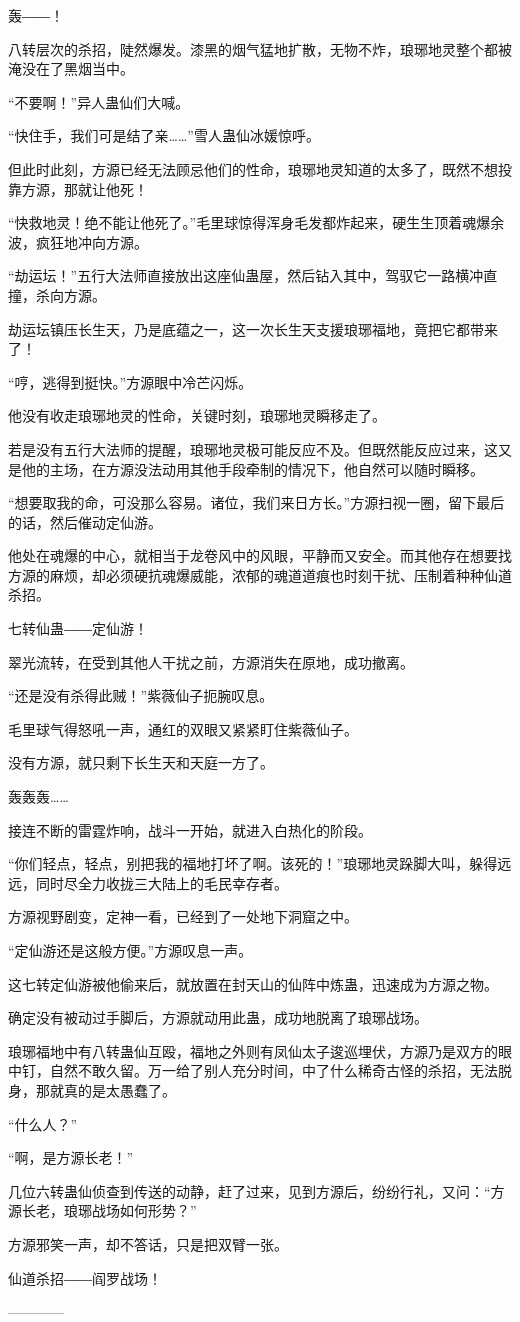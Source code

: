 \begin{this_body}
轰――！

八转层次的杀招，陡然爆发。漆黑的烟气猛地扩散，无物不炸，琅琊地灵整个都被淹没在了黑烟当中。

“不要啊！”异人蛊仙们大喊。

“快住手，我们可是结了亲……”雪人蛊仙冰媛惊呼。

但此时此刻，方源已经无法顾忌他们的性命，琅琊地灵知道的太多了，既然不想投靠方源，那就让他死！

“快救地灵！绝不能让他死了。”毛里球惊得浑身毛发都炸起来，硬生生顶着魂爆余波，疯狂地冲向方源。

“劫运坛！”五行大法师直接放出这座仙蛊屋，然后钻入其中，驾驭它一路横冲直撞，杀向方源。

劫运坛镇压长生天，乃是底蕴之一，这一次长生天支援琅琊福地，竟把它都带来了！

“哼，逃得到挺快。”方源眼中冷芒闪烁。

他没有收走琅琊地灵的性命，关键时刻，琅琊地灵瞬移走了。

若是没有五行大法师的提醒，琅琊地灵极可能反应不及。但既然能反应过来，这又是他的主场，在方源没法动用其他手段牵制的情况下，他自然可以随时瞬移。

“想要取我的命，可没那么容易。诸位，我们来日方长。”方源扫视一圈，留下最后的话，然后催动定仙游。

他处在魂爆的中心，就相当于龙卷风中的风眼，平静而又安全。而其他存在想要找方源的麻烦，却必须硬抗魂爆威能，浓郁的魂道道痕也时刻干扰、压制着种种仙道杀招。

七转仙蛊――定仙游！

翠光流转，在受到其他人干扰之前，方源消失在原地，成功撤离。

“还是没有杀得此贼！”紫薇仙子扼腕叹息。

毛里球气得怒吼一声，通红的双眼又紧紧盯住紫薇仙子。

没有方源，就只剩下长生天和天庭一方了。

轰轰轰……

接连不断的雷霆炸响，战斗一开始，就进入白热化的阶段。

“你们轻点，轻点，别把我的福地打坏了啊。该死的！”琅琊地灵跺脚大叫，躲得远远，同时尽全力收拢三大陆上的毛民幸存者。

方源视野剧变，定神一看，已经到了一处地下洞窟之中。

“定仙游还是这般方便。”方源叹息一声。

这七转定仙游被他偷来后，就放置在封天山的仙阵中炼蛊，迅速成为方源之物。

确定没有被动过手脚后，方源就动用此蛊，成功地脱离了琅琊战场。

琅琊福地中有八转蛊仙互殴，福地之外则有凤仙太子逡巡埋伏，方源乃是双方的眼中钉，自然不敢久留。万一给了别人充分时间，中了什么稀奇古怪的杀招，无法脱身，那就真的是太愚蠢了。

“什么人？”

“啊，是方源长老！”

几位六转蛊仙侦查到传送的动静，赶了过来，见到方源后，纷纷行礼，又问：“方源长老，琅琊战场如何形势？”

方源邪笑一声，却不答话，只是把双臂一张。

仙道杀招――阎罗战场！

------------

\end{this_body}

